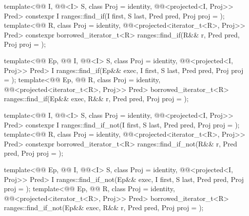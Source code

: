 \begin{itemdecl}
template<@@ I, @@<I> S, class Proj = identity,
         @@<projected<I, Proj>> Pred>
  constexpr I ranges::find_if(I first, S last, Pred pred, Proj proj = {});
template<@@ R, class Proj = identity,
         @@<projected<iterator_t<R>, Proj>> Pred>
  constexpr borrowed_iterator_t<R>
    ranges::find_if(R&& r, Pred pred, Proj proj = {});

template<@@ Ep, @@ I, @@<I> S,
         class Proj = identity, @@<projected<I, Proj>> Pred>
  I ranges::find_if(Ep&& exec, I first, S last, Pred pred, Proj proj = {});
template<@@ Ep, @@ R, class Proj = identity,
         @@<projected<iterator_t<R>, Proj>> Pred>
  borrowed_iterator_t<R> ranges::find_if(Ep&& exec, R&& r, Pred pred, Proj proj = {});

template<@@ I, @@<I> S, class Proj = identity,
         @@<projected<I, Proj>> Pred>
  constexpr I ranges::find_if_not(I first, S last, Pred pred, Proj proj = {});
template<@@ R, class Proj = identity,
         @@<projected<iterator_t<R>, Proj>> Pred>
  constexpr borrowed_iterator_t<R>
    ranges::find_if_not(R&& r, Pred pred, Proj proj = {});

template<@@ Ep, @@ I, @@<I> S,
         class Proj = identity, @@<projected<I, Proj>> Pred>
  I ranges::find_if_not(Ep&& exec, I first, S last, Pred pred, Proj proj = {});
template<@@ Ep, @@ R, class Proj = identity,
         @@<projected<iterator_t<R>, Proj>> Pred>
  borrowed_iterator_t<R> ranges::find_if_not(Ep&& exec, R&& r, Pred pred, Proj proj = {});
\end{itemdecl}

